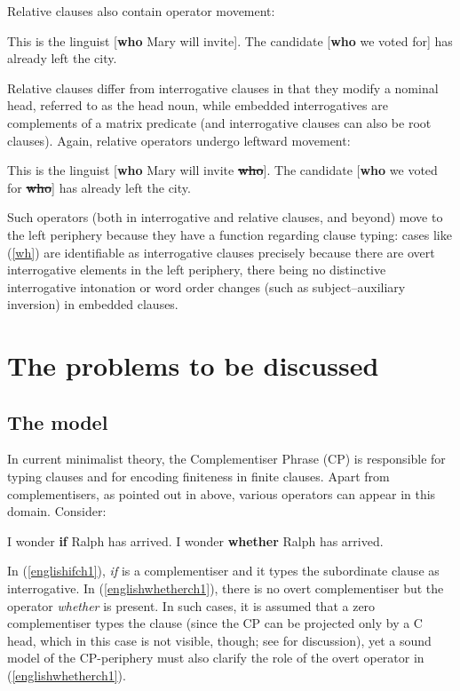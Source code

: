 Relative clauses also contain operator movement:

\ea
\ea This is the linguist [\textbf{who} Mary will invite].
\ex The candidate [\textbf{who} we voted for] has already left the city.
\z
\z

Relative clauses differ from interrogative clauses in that they modify a nominal head, referred to as the head noun, while embedded interrogatives are complements of a matrix predicate (and interrogative clauses can also be root clauses). Again, relative operators undergo leftward movement:

\ea
\ea This is the linguist [\textbf{who} Mary will invite \sout{\textbf{who}}].
\ex The candidate [\textbf{who} we voted for \sout{\textbf{who}}] has already left the city.
\z
\z

Such operators (both in interrogative and relative clauses, and beyond) move to the left periphery because they have a function regarding clause typing: cases like (\ref{wh}) are identifiable as interrogative clauses precisely because there are overt interrogative elements in the left periphery, there being no distinctive interrogative intonation or word order changes (such as subject--auxiliary inversion) in embedded clauses.

\section{The problems to be discussed} \label{sec:1problems}
\subsection{The model} \label{sec:1model}
In current minimalist theory, the Complementiser Phrase (CP) is responsible for typing clauses and for encoding finiteness in finite clauses. Apart from complementisers, as pointed out in  above, various operators can appear in this domain. Consider:

\ea
\ea I wonder \textbf{if} Ralph has arrived. \label{englishifch1}
\ex I wonder \textbf{whether} Ralph has arrived. \label{englishwhetherch1}
\z
\z

In (\ref{englishifch1}), \textit{if} is a complementiser and it types the subordinate clause as interrogative. In (\ref{englishwhetherch1}), there is no overt complementiser but the operator \textit{whether} is present. In such cases, it is assumed that a zero complementiser types the clause (since the CP can be projected only by a C head, which in this case is not visible, though; see \citealt[137--138]{bacskaiatkari2020jcgl} for discussion), yet a sound model of the CP-periphery must also clarify the role of the overt operator  in (\ref{englishwhetherch1}).

